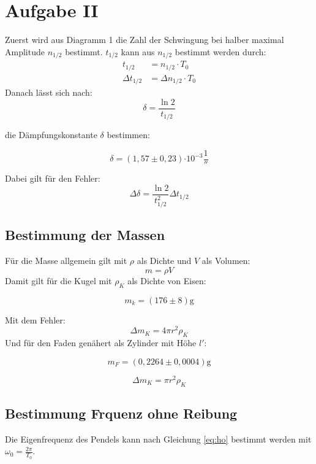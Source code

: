 \section{Aufgabe II}

Zuerst wird aus Diagramm 1 die Zahl der Schwingung bei halber maximal Amplitude $n_{1/2}$ bestimmt. 
$t_{1/2}$ kann aus $n_{1/2}$ bestimmt werden durch:
\begin{align}
    t_{1/2} &= n_{1/2} \cdot T_0 \\
    \Delta t_{1/2} &= \Delta n_{1/2} \cdot T_0
\end{align}
Danach lässt sich nach:
\begin{equation}
    \delta = \frac{\ln 2}{t_{1/2}}
\end{equation}

die Dämpfungskonstante $\delta$ bestimmen:

\[ \delta = (1,57 \pm 0,23) \si{\cdot 10^{-3}\frac{1}{\second}}\]

Dabei gilt für den Fehler:
\begin{equation}
    \Delta \delta = \frac{\ln 2}{t_{1/2}^2}\Delta t_{1/2}
\end{equation}



\subsection{Bestimmung der Massen}

Für die Masse allgemein gilt mit $\rho$ als Dichte und $V$ als Volumen:
\begin{equation}
    m = \rho V
\end{equation}
Damit gilt für die Kugel mit $\rho_K$ als Dichte von Eisen:

\[m_k = (176 \pm 8) \si{\gram}\]

Mit dem Fehler:
\begin{equation}
    \Delta m_K = 4\pi r^2 \rho_K
\end{equation}
Und für den Faden genähert als Zylinder mit Höhe $l'$:

\[m_F = (0,2264 \pm 0,0004) \si{\gram}\]

\begin{equation}
    \Delta m_K = \pi r^2 \rho_K
\end{equation}

\subsection{Bestimmung Frquenz ohne Reibung}
Die Eigenfrequenz des Pendels kann nach Gleichung \ref{eq:ho} bestimmt werden mit $\omega_0 = \tfrac{2\pi}{T_0}$. 

